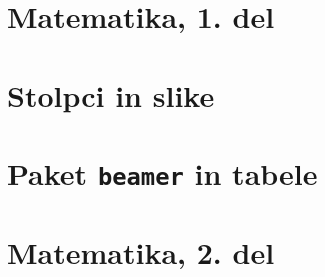 \documentclass{beamer}
\begin{document}
\section[Matematika, 1. del\\\large{Analiza, logika, množice}]{Matematika, 1. del}

\section{Stolpci in slike}




\section{Paket \texttt{beamer} in tabele}


\section[Matematika, 2. del\\\large{Zaporedja, algebra, grupe}]{Matematika, 2. del}

\end{document}
